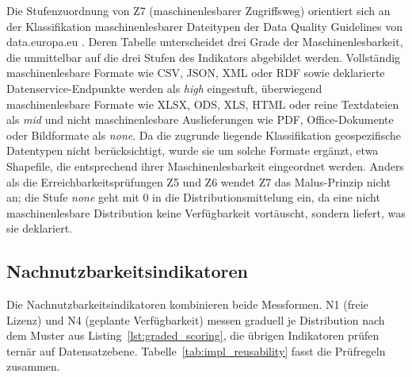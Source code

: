 Die Stufenzuordnung von Z7 (maschinenlesbarer Zugriffsweg) orientiert sich an der Klassifikation maschinenlesbarer Dateitypen der Data Quality Guidelines von data.europa.eu \cite{dataeuropa_dqguidelines}. Deren Tabelle unterscheidet drei Grade der Maschinenlesbarkeit, die unmittelbar auf die drei Stufen des Indikators abgebildet werden. Vollständig maschinenlesbare Formate wie CSV, JSON, XML oder RDF sowie deklarierte Datenservice-Endpunkte werden als \textit{high} eingestuft, überwiegend maschinenlesbare Formate wie XLSX, ODS, XLS, \acrshort{HTML} oder reine Textdateien als \textit{mid} und nicht maschinenlesbare Auslieferungen wie \acrshort{PDF}, Office-Dokumente oder Bildformate als \textit{none}. Da die zugrunde liegende Klassifikation geospezifische Datentypen nicht berücksichtigt, wurde sie um solche Formate ergänzt, etwa Shapefile, die entsprechend ihrer Maschinenlesbarkeit eingeordnet werden. Anders als die Erreichbarkeitsprüfungen Z5 und Z6 wendet Z7 das Malus-Prinzip nicht an; die Stufe \textit{none} geht mit 0 in die Distributionsmittelung ein, da eine nicht maschinenlesbare Distribution keine Verfügbarkeit vortäuscht, sondern liefert, was sie deklariert.

\subsection{Nachnutzbarkeitsindikatoren}

Die Nachnutzbarkeitsindikatoren kombinieren beide Messformen. N1 (freie Lizenz) und N4 (geplante Verfügbarkeit) messen graduell je Distribution nach dem Muster aus Listing~\ref{lst:graded_scoring}, die übrigen Indikatoren prüfen ternär auf Datensatzebene. Tabelle~\ref{tab:impl_reusability} fasst die Prüfregeln zusammen.

